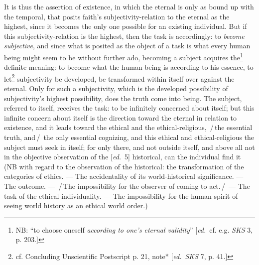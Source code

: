\documentclass[12pt,a4paper,openany]{book}
\newcommand{\kpage}[1]{\marginnote{\footnotesize\textit{[#1]}}}
\newcommand{\ed}[1]{{\small[\textit{ed.}\ #1]}}
\newcommand{\ins}[1]{\,/\,#1\,/\,}
\begin{document}
It is thus the assertion of existence, in which the eternal
is only as bound up with the temporal, that posits faith's subjectivity-relation
to the eternal as the highest, since it becomes the only
one possible for an existing individual. But if this subjectivity-relation is
the highest, then the task is accordingly: to \emph{become subjective}, and since what
is posited as the object of a task is what every human being
might seem to be without further ado, becoming a subject acquires
the\footnote[48]{NB: ``to choose oneself \emph{according to one's eternal validity}'' \ed{cf. e.g. \emph{SKS} 3, p. 203.}} definite meaning: to become what the human being is according to his
essence, to let\footnote[49]{cf. Concluding Unscientific Postscript p. 21, note* \ed{\emph{SKS} 7, p. 41.}} subjectivity be developed, be transformed within itself over against
the eternal. Only for such a subjectivity, which is the developed
possibility of subjectivity's highest possibility, does
\kpage{127}the truth come into being. The subject, referred to itself, receives the task:
to be infinitely concerned about itself; but this infinite
concern about itself is the direction toward the eternal in relation to
existence, and it leads toward the ethical and the ethical-religious,
\ins{the essential truth, and} the only essential cognizing,
and this ethical and ethical-religious the subject must seek in
itself; for only there, and not outside itself, and above all not in the objective
observation of the \ed{5} historical, can the individual find it
(NB with regard to the observation of the historical: the transformation
of the categories of ethics. --- The accidentality of its world-historical
significance. --- The outcome. --- \ins{The impossibility for the observer
of coming to act.} --- The task of the ethical individuality.
--- The impossibility for the human spirit of seeing world history
as an ethical world order.)
\end{document}
